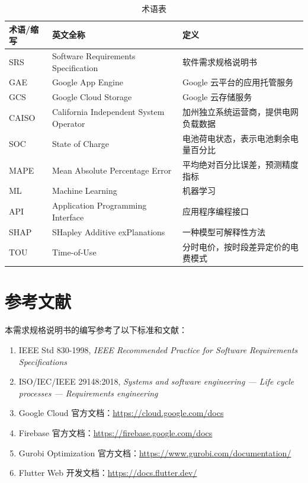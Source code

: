 \begin{table}[H]
    \centering
    \caption{术语表}
    \label{tab:terminology}
    \begin{tabularx}{\textwidth}{@{}l l X@{}}
        \toprule
        \textbf{术语/缩写} & \textbf{英文全称}                          & \textbf{定义}        \\
        \midrule
        SRS            & Software Requirements Specification    & 软件需求规格说明书          \\
        GAE            & Google App Engine                      & Google 云平台的应用托管服务  \\
        GCS            & Google Cloud Storage                   & Google 云存储服务       \\
        CAISO          & California Independent System Operator & 加州独立系统运营商，提供电网负载数据 \\
        SOC            & State of Charge                        & 电池荷电状态，表示电池剩余电量百分比 \\
        MAPE           & Mean Absolute Percentage Error         & 平均绝对百分比误差，预测精度指标   \\
        ML             & Machine Learning                       & 机器学习               \\
        API            & Application Programming Interface      & 应用程序编程接口           \\
        SHAP           & SHapley Additive exPlanations          & 一种模型可解释性方法         \\
        TOU            & Time-of-Use                            & 分时电价，按时段差异定价的电费模式  \\
        \bottomrule
    \end{tabularx}
\end{table}

\section{参考文献}

本需求规格说明书的编写参考了以下标准和文献：

\begin{enumerate}
    \item IEEE Std 830-1998, \textit{IEEE Recommended Practice for Software Requirements Specifications}
    \item ISO/IEC/IEEE 29148:2018, \textit{Systems and software engineering — Life cycle processes — Requirements engineering}
    \item Google Cloud 官方文档：\url{https://cloud.google.com/docs}
    \item Firebase 官方文档：\url{https://firebase.google.com/docs}
    \item Gurobi Optimization 官方文档：\url{https://www.gurobi.com/documentation/}
    \item Flutter Web 开发文档：\url{https://docs.flutter.dev/}
\end{enumerate}

